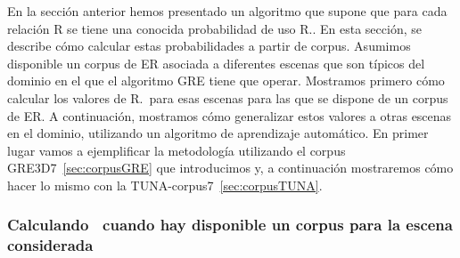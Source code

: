 En la secci\'on anterior hemos presentado un algoritmo que supone que para
cada relaci\'on R se tiene una conocida
probabilidad de uso R.\puse. En esta secci\'on, se describe c\'omo
calcular estas probabilidades a partir de corpus. Asumimos disponible un corpus de ER asociada a diferentes
escenas que son t\'{i}picos del dominio en el que el algoritmo GRE tiene que operar. Mostramos primero c\'omo calcular los valores de R.\puse\ para
esas escenas para las que se dispone de un corpus de ER. A continuaci\'on, mostramos c\'omo
generalizar estos valores a otras escenas en el dominio, utilizando un
algoritmo de aprendizaje autom\'atico. En primer lugar vamos a ejemplificar la
metodolog\'{i}a utilizando el corpus GRE3D7~\ref{sec:corpusGRE} que introducimos y, a continuaci\'on mostraremos c\'omo hacer lo mismo con
la TUNA-corpus7~\ref{sec:corpusTUNA}.


\subsubsection{Calculando \puse\ cuando hay disponible un corpus para la escena considerada}





